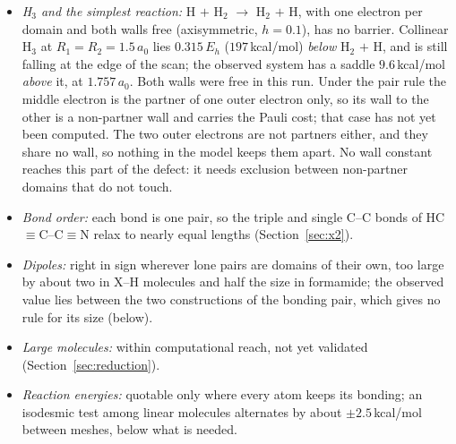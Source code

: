 \documentclass[11pt]{article}
\begin{document}
\begin{itemize}
\item \emph{H$_3$ and the simplest reaction:} H $+$ H$_2$ $\to$ H$_2$ $+$ H, with one electron per domain and both
  walls free (axisymmetric, $h = 0.1$), has no barrier. Collinear H$_3$ at $R_1 = R_2 = 1.5\,a_0$ lies
  $0.315\,E_h$ ($197$\,kcal/mol) \emph{below} H$_2$ $+$ H, and is still falling at the edge of the scan; the
  observed system has a saddle $9.6$\,kcal/mol \emph{above} it, at $1.757\,a_0$. Both walls were
  free in this run. Under the pair rule the middle electron is the partner of one outer electron only, so
  its wall to the other is a non-partner wall and carries the Pauli cost; that case has not yet been
  computed. The two outer electrons are not partners either, and they share no wall, so nothing in the model
  keeps them apart. No wall constant reaches this part of the defect: it needs exclusion between
  non-partner domains that do not touch.
\item \emph{Bond order:} each bond is one pair, so the triple and single C--C bonds of HC$\equiv$C--C$\equiv$N
  relax to nearly equal lengths (Section~\ref{sec:x2}).
\item \emph{Dipoles:} right in sign wherever lone pairs are domains of their own, too large by about two
  in X--H molecules and half the size in formamide; the observed value lies between the two constructions of
  the bonding pair, which gives no rule for its size (below).
\item \emph{Large molecules:} within computational reach, not yet validated (Section~\ref{sec:reduction}).
\item \emph{Reaction energies:} quotable only where every atom keeps its bonding; an isodesmic test among
  linear molecules alternates by about $\pm2.5$\,kcal/mol between meshes, below what is needed.
\end{itemize}
\end{document}
